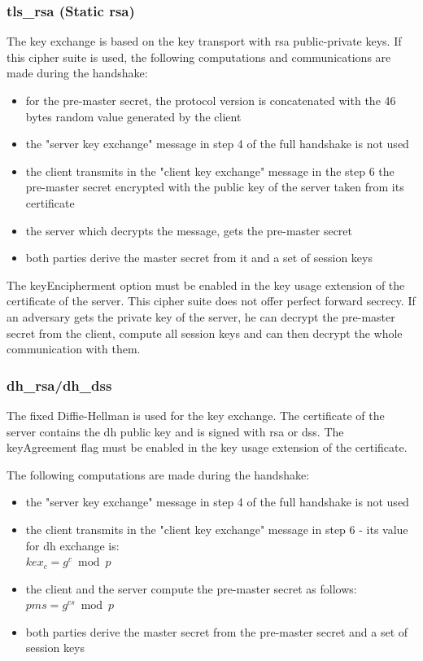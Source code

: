 \subsubsection*{\gls{tls}\_\gls{rsa} (Static \gls{rsa})} 
The key exchange is based on the key transport with \gls{rsa} public-private keys.
If this cipher suite is used, the following computations and communications are made during the handshake:
\begin{itemize}
	\item for the pre-master secret, the protocol version is concatenated with the 46 bytes random value generated by the client
	\item the "server key exchange" message in step 4 of the full handshake is not used
	\item the client transmits in the "client key exchange" message in the step 6 the pre-master secret encrypted with the public key of the server taken from its certificate
	\item the server which decrypts the message, gets the pre-master secret 
	\item both parties derive the master secret from it and a set of session keys
\end{itemize}

The keyEncipherment option must be enabled in the key usage extension of the certificate of the server.
This cipher suite does not offer perfect forward secrecy. If an adversary gets the private key of the server, he can decrypt the pre-master secret from the client, compute all session keys and can then decrypt the whole communication with them.

\subsubsection*{\gls{dh}\_\gls{rsa}/\gls{dh}\_\gls{dss}}
The fixed Diffie-Hellman is used for the key exchange. The certificate of the server contains the \gls{dh} public key and is signed with \gls{rsa} or \gls{dss}.
The keyAgreement flag must be enabled in the key usage extension of the certificate.

The following computations are made during the handshake:
\begin{itemize}
	\item the "server key exchange" message in step 4 of the full handshake is not used
	\item the client transmits in the "client key exchange" message in step 6 - its value for \gls{dh} exchange is: \\ $\displaystyle kex_c = g^c \bmod p $ 
	\item the client and the server compute the pre-master secret as follows: $\displaystyle pms = g^{cs} \bmod p$
	\item both parties derive the master secret from the pre-master secret and a set of session keys
\end{itemize}

